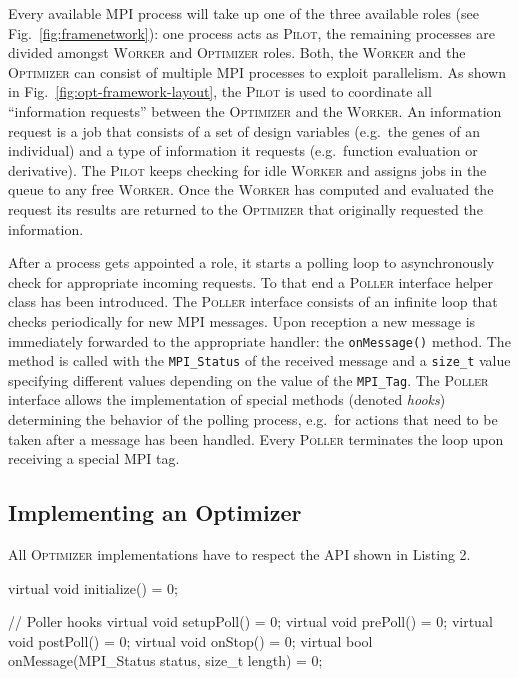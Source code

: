 \documentclass[preprint,linenumbers,amsmath,amssymb,aps,prstab]{revtex4-1}%
\begin{document}
Every available MPI process will take up one of the three available roles (see
  Fig.~\ref{fig:framenetwork}):  one process acts as \textsc{Pilot}, the
  remaining processes are divided amongst \textsc{Worker} and
  \textsc{Optimizer} roles.
Both, the \textsc{Worker} and the \textsc{Optimizer} can consist of multiple
  MPI processes to exploit parallelism.
As shown in Fig.~\ref{fig:opt-framework-layout}, the \textsc{Pilot} is used
  to coordinate all ``information requests'' between the \textsc{Optimizer}
  and the \textsc{Worker}.
An information request is a job that consists of a set of design variables
  (e.g.~the genes of an individual) and a type of information it requests
  (e.g.~function evaluation or derivative).
The \textsc{Pilot} keeps checking for idle \textsc{Worker} and assigns jobs
  in the queue to any free \textsc{Worker}.
Once the \textsc{Worker} has computed and evaluated the request its results
  are returned to the \textsc{Optimizer} that originally requested the
  information.

After a process gets appointed a role, it starts a polling loop to asynchronously
  check for appropriate incoming requests.
To that end a \textsc{Poller} interface helper class has been introduced.
The \textsc{Poller} interface consists of an infinite loop that checks
  periodically for new MPI messages.
Upon reception a new message is immediately forwarded to the appropriate
  handler: the \texttt{onMessage()} method.
The method is called with the \texttt{MPI\_Status} of the received message and
  a \texttt{size\_t} value specifying different values depending on the value
  of the \texttt{MPI\_Tag}.
The \textsc{Poller} interface allows the implementation of special methods
  (denoted \textit{hooks}) determining the behavior of the polling process,
  e.g.\ for actions that need to be taken after a message has been handled.
Every \textsc{Poller} terminates the loop upon receiving a special MPI tag.


\subsection{Implementing an Optimizer}

All \textsc{Optimizer} implementations have to respect the API shown in
Listing 2.

\begin{code}
virtual void initialize() = 0;

// Poller hooks
virtual void setupPoll() = 0;
virtual void prePoll() = 0;
virtual void postPoll() = 0;
virtual void onStop() = 0;
virtual bool onMessage(MPI_Status status,
                       size_t length) = 0;
\end{code}
\end{document}
